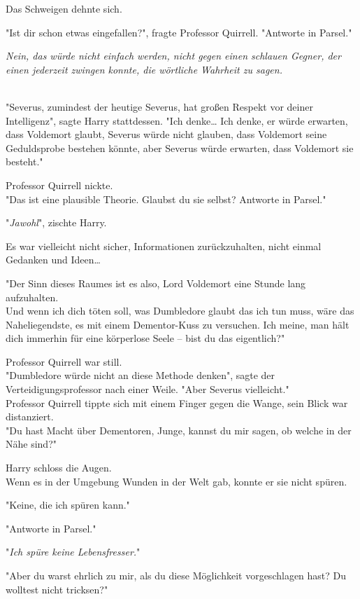 {Das Schweigen dehnte sich.

"Ist dir schon etwas eingefallen?", fragte Professor Quirrell. "Antworte in Parsel."

\emph{Nein, das würde nicht einfach werden, nicht gegen einen schlauen Gegner, der einen jederzeit zwingen konnte, die wörtliche Wahrheit zu sagen.\\ }\strut \\ "Severus, zumindest der heutige Severus, hat großen Respekt vor deiner Intelligenz", sagte Harry stattdessen. "Ich denke… Ich denke, er würde erwarten, dass Voldemort glaubt, Severus würde nicht glauben, dass Voldemort seine Geduldsprobe bestehen könnte, aber Severus würde erwarten, dass Voldemort sie besteht."

Professor Quirrell nickte.\\ "Das ist eine plausible Theorie. Glaubst du sie selbst? Antworte in Parsel."

"\emph{Jawohl}", zischte Harry.

Es war vielleicht nicht sicher, Informationen zurückzuhalten, nicht einmal Gedanken und Ideen…

"Der Sinn dieses Raumes ist es also, Lord Voldemort eine Stunde lang aufzuhalten.\\ Und wenn ich dich töten soll, was Dumbledore glaubt das ich tun muss, wäre das Naheliegendste, es mit einem Dementor-Kuss zu versuchen. Ich meine, man hält dich immerhin für eine körperlose Seele -- bist du das eigentlich?"

Professor Quirrell war still.\\ "Dumbledore würde nicht an diese Methode denken", sagte der Verteidigungsprofessor nach einer Weile. "Aber Severus vielleicht."\\ Professor Quirrell tippte sich mit einem Finger gegen die Wange, sein Blick war distanziert.\\ "Du hast Macht über Dementoren, Junge, kannst du mir sagen, ob welche in der Nähe sind?"

Harry schloss die Augen.\\ Wenn es in der Umgebung Wunden in der Welt gab, konnte er sie nicht spüren.

"Keine, die ich spüren kann."

"Antworte in Parsel."

"\emph{Ich spüre keine Lebensfresser.}"

"Aber du warst ehrlich zu mir, als du diese Möglichkeit vorgeschlagen hast? Du wolltest nicht tricksen?"

}
